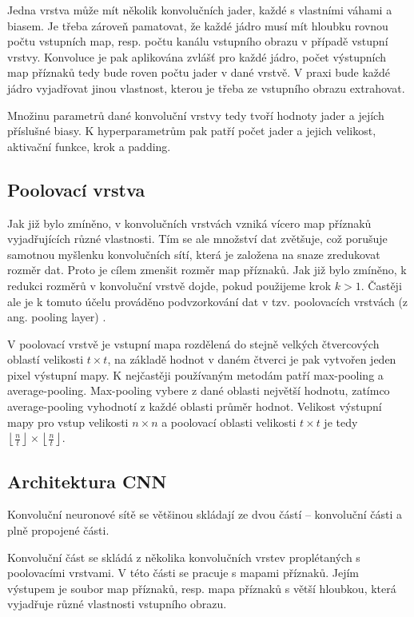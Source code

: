 Jedna vrstva může mít několik konvolučních jader, každé s vlastními váhami a
biasem. Je třeba zároveň pamatovat, že každé jádro musí mít hloubku rovnou
počtu vstupních map, resp. počtu kanálu vstupního obrazu v případě vstupní
vrstvy. Konvoluce je pak aplikována zvlášť pro každé jádro, počet výstupních map
příznaků tedy bude roven počtu jader v dané vrstvě. V praxi bude každé jádro
vyjadřovat jinou vlastnost, kterou je třeba ze vstupního obrazu extrahovat.

Množinu parametrů dané konvoluční vrstvy tedy tvoří hodnoty jader a jejích
příslušné biasy. K hyperparametrům pak patří počet jader a jejich velikost,
aktivační funkce, krok a padding.

\subsection{Poolovací vrstva}
Jak již bylo zmíněno, v konvolučních vrstvách vzniká vícero map příznaků
vyjadřujících různé vlastnosti. Tím se ale množství dat zvětšuje, což porušuje
samotnou myšlenku konvolučních sítí, která je založena na snaze zredukovat
rozměr dat. Proto je cílem zmenšit rozměr map příznaků. Jak již bylo
zmíněno, k redukci rozměrů v konvoluční vrstvě dojde, pokud použijeme krok $k >
    1$. Častěji ale je k tomuto účelu prováděno podvzorkování dat v tzv.
poolovacích vrstvách (z ang. pooling layer) \cite{rawat2017deep}.

V poolovací vrstvě je vstupní mapa rozdělená do stejně velkých čtvercových
oblastí velikosti $t \times t$, na základě hodnot v daném čtverci je pak
vytvořen jeden pixel výstupní mapy. K nejčastěji používaným metodám patří
max-pooling a average-pooling. Max-pooling vybere z dané oblasti největší
hodnotu, zatímco average-pooling vyhodnotí z každé oblasti průměr hodnot.
Velikost výstupní mapy pro vstup velikosti $n \times n$ a poolovací oblasti
velikosti $t \times t$ je tedy $\left\lfloor \frac{n}{t} \right\rfloor \times
    \left\lfloor \frac{n}{t} \right\rfloor$.

\subsection{Architektura CNN}

Konvoluční neuronové sítě se většinou skládají ze dvou částí – konvoluční části a plně
propojené části.

Konvoluční část se skládá z několika konvolučních vrstev proplétaných s
poolovacími vrstvami. V této části se pracuje s mapami příznaků. Jejím výstupem
je soubor map příznaků, resp. mapa příznaků s větší hloubkou, která vyjadřuje
různé vlastnosti vstupního obrazu.

